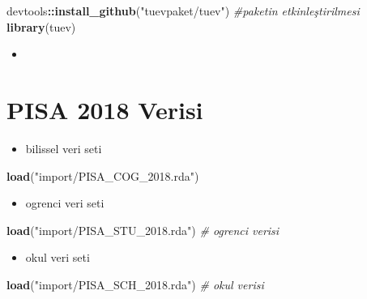 \documentclass[
  oneside]{book}
\newenvironment{Shaded}{\begin{snugshade}}{\end{snugshade}}
\newcommand{\CommentTok}[1]{\textcolor[rgb]{0.56,0.35,0.01}{\textit{#1}}}
\newcommand{\FunctionTok}[1]{\textcolor[rgb]{0.13,0.29,0.53}{\textbf{#1}}}
\newcommand{\NormalTok}[1]{#1}
\newcommand{\SpecialCharTok}[1]{\textcolor[rgb]{0.81,0.36,0.00}{\textbf{#1}}}
\newcommand{\StringTok}[1]{\textcolor[rgb]{0.31,0.60,0.02}{#1}}
\providecommand{\tightlist}{%
  \setlength{\itemsep}{0pt}\setlength{\parskip}{0pt}}
\begin{document}
\begin{Shaded}
\begin{Highlighting}[]
\NormalTok{devtools}\SpecialCharTok{::}\FunctionTok{install\_github}\NormalTok{(}\StringTok{"tuevpaket/tuev"}\NormalTok{)}
\CommentTok{\#paketin etkinleştirilmesi}
\FunctionTok{library}\NormalTok{(tuev)}
\end{Highlighting}
\end{Shaded}

\begin{itemize}
\tightlist
\item
\end{itemize}

\hypertarget{pisa-2018-verisi}{%
\section{PISA 2018 Verisi}\label{pisa-2018-verisi}}

\begin{itemize}
\tightlist
\item
  bilissel veri seti
\end{itemize}

\begin{Shaded}
\begin{Highlighting}[]
\FunctionTok{load}\NormalTok{(}\StringTok{"import/PISA\_COG\_2018.rda"}\NormalTok{)}
\end{Highlighting}
\end{Shaded}

\begin{itemize}
\tightlist
\item
  ogrenci veri seti
\end{itemize}

\begin{Shaded}
\begin{Highlighting}[]
\FunctionTok{load}\NormalTok{(}\StringTok{"import/PISA\_STU\_2018.rda"}\NormalTok{) }\CommentTok{\# ogrenci verisi}
\end{Highlighting}
\end{Shaded}

\begin{itemize}
\tightlist
\item
  okul veri seti
\end{itemize}

\begin{Shaded}
\begin{Highlighting}[]
\FunctionTok{load}\NormalTok{(}\StringTok{"import/PISA\_SCH\_2018.rda"}\NormalTok{) }\CommentTok{\# okul verisi}
\end{Highlighting}
\end{Shaded}
\end{document}
